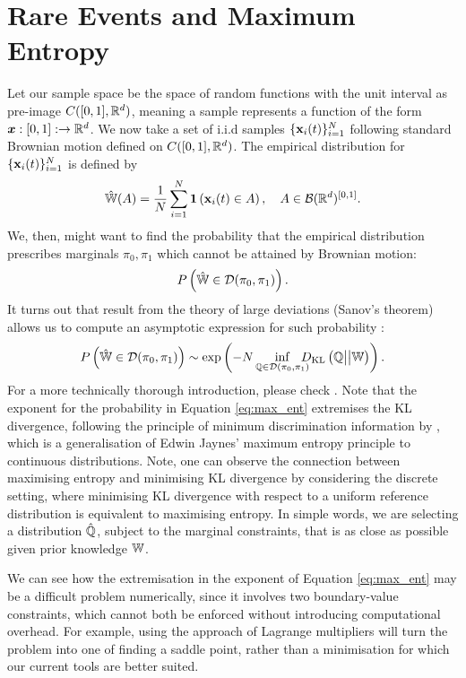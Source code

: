 \documentclass[a4paper,12pt,twoside,openright]{report}
\theoremstyle{definition}
\begin{document}
\section{Rare Events and Maximum Entropy }

Let our sample space be the space of random functions with the unit interval as pre-image $C([0,1], {\mathbb{R}}^d)$, meaning a sample  represents a function of the form ${\bm{x}} : [0, 1]:  \rightarrow {\mathbb{R}}^d$.  We now take a set of i.i.d samples $\{{\mathbf{x}}_{i}(t)\}_{i=1}^N$ following standard Brownian motion defined on $C([0,1], {\mathbb{R}}^d)$. The empirical distribution for $\{{\mathbf{x}}_{i}(t)\}_{i=1}^N$ is defined by
\begin{align}\label{eq:empirical}
    \hat{\mathbb{W}}(A) = \frac{1}{N}\sum_{i=1}^N {\bm{1}}\left({\mathbf{x}}_i(t) \in A\right)  , \quad A \in {\mathcal{B}}({\mathbb{R}}^d)^{[0,1]}.
\end{align}
We, then, might want to find the probability that the empirical distribution prescribes marginals $\pi_0, \pi_1$ which cannot be attained by Brownian motion:
\begin{align}
    {P}\left(\hat{\mathbb{W}} \in {\mathcal{D}}(\pi_0, \pi_1) \right).
\end{align}
It turns out that result from the theory of large deviations (Sanov's theorem) allows us to compute an asymptotic expression for such probability \citep{leonard2012schrodinger}:
\begin{align} \label{eq:max_ent}
    {P}\left(\hat{\mathbb{W}} \in \mathcal{D}(\pi_0, \pi_1) \right) \sim \exp\left(-N\inf_{{\mathbb{Q}} \in {\mathcal{D}}(\pi_0, \pi_1)} \!\!\!\!\!D_{\mathrm{KL}}\left({\mathbb{Q}} \big|\big| \mathbb{W}\right)\right).
\end{align}
For a more technically thorough introduction, please check \cite{leonard2013survey}. Note that the exponent for the probability in Equation \ref{eq:max_ent} extremises the KL divergence, following the principle of minimum discrimination information by \cite{kullback1997information}, which is a generalisation of Edwin Jaynes' maximum entropy principle \citep{jaynes1957information,jaynes2003probability} to continuous distributions. Note, one can observe the connection between maximising entropy and minimising KL divergence by considering the discrete setting, where minimising KL divergence with respect to a uniform reference distribution is equivalent to maximising entropy. In simple words, we are selecting a distribution $\hat{{\mathbb{Q}}}$, subject to the marginal constraints, that is as close as possible given prior knowledge $\mathbb{W}$.

We can see how the extremisation in the exponent of Equation \ref{eq:max_ent} may be a difficult problem numerically, since it involves two boundary-value constraints, which cannot both be enforced without introducing computational overhead. For example, using the approach of Lagrange multipliers will turn the problem into one of finding a saddle point, rather than a minimisation for which our current tools are better suited.
\end{document}
